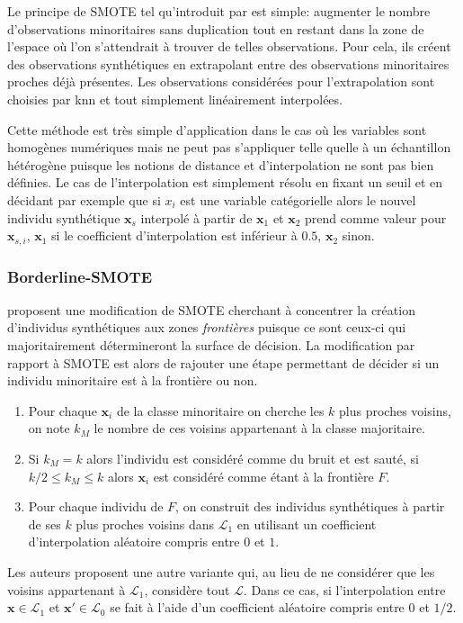 Le principe de SMOTE tel qu'introduit par \citet{Chawla2002a} est simple: augmenter le nombre d'observations minoritaires sans duplication tout en restant dans la zone de l'espace où l'on s'attendrait à trouver de telles observations. Pour cela, ils créent des observations synthétiques en extrapolant entre des observations minoritaires proches déjà présentes. Les observations considérées pour l'extrapolation sont choisies par \ac{knn} et tout simplement linéairement interpolées.

Cette méthode est très simple d'application dans le cas où les variables sont homogènes numériques mais ne peut pas s'appliquer telle quelle à un échantillon hétérogène puisque les notions de distance et d'interpolation ne sont pas bien définies. Le cas de l'interpolation est simplement résolu en fixant un seuil et en décidant par exemple que si $x_i$ est une variable catégorielle alors le nouvel individu synthétique $\mathbf{x}_s$ interpolé à partir de $\mathbf{x}_1$ et $\mathbf{x}_2$ prend comme valeur pour $\mathbf{x}_{s,i}$, $\mathbf{x}_1$ si le coefficient d'interpolation est inférieur à $0.5$, $\mathbf{x}_2$ sinon.

\subsubsection{Borderline-SMOTE}

\citet{Han2005} proposent une modification de SMOTE cherchant à concentrer la création d'individus synthétiques aux zones \emph{frontières} puisque ce sont ceux-ci qui majoritairement détermineront la surface de décision. La modification par rapport à SMOTE est alors de rajouter une étape permettant de décider si un individu minoritaire est à la frontière ou non.
\begin{enumerate}
    \item Pour chaque $\mathbf{x}_i$ de la classe minoritaire on cherche les $k$ plus proches voisins, on note $k_M$ le nombre de ces voisins appartenant à la classe majoritaire.
    \item Si $k_M = k$ alors l'individu est considéré comme du bruit et est sauté, si $k/2 \leq k_M \leq k$ alors $\mathbf{x}_i$ est considéré comme étant à la frontière $F$.
    \item Pour chaque individu de $F$, on construit des individus synthétiques à partir de ses $k$ plus proches voisins dans $\mathcal{L}_1$ en utilisant un coefficient d'interpolation aléatoire compris entre $0$ et $1$.
\end{enumerate}
Les auteurs proposent une autre variante qui, au lieu de ne considérer que les voisins appartenant à $\mathcal{L}_1$, considère tout $\mathcal{L}$. Dans ce cas, si l'interpolation entre $\mathbf{x} \in \mathcal{L}_1$ et $\mathbf{x'} \in \mathcal{L}_0$ se fait à l'aide d'un coefficient aléatoire compris entre $0$ et $1/2$.

